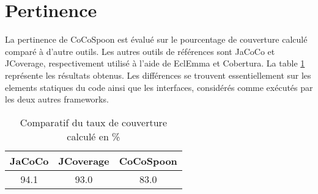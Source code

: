 \section{Pertinence}

La pertinence de CoCoSpoon est évalué sur le pourcentage de couverture calculé comparé à d'autre outils. Les autres outils de références sont JaCoCo et JCoverage, respectivement utilisé à l'aide de EclEmma et Cobertura. La table \ref{evaluation_pertinence} représente les résultats obtenus. Les différences se trouvent essentiellement sur les elements statiques du code ainsi que les interfaces, considérés comme exécutés par les deux autres frameworks. 

\begin{table}[H]
\centering
\begin{tabular}{|c|c|c|}
  \hline
  JaCoCo & JCoverage & CoCoSpoon \\
  \hline
  94.1 & 93.0 & 83.0 \\
  \hline
\end{tabular}

\label{evaluation_pertinence}
\caption{Comparatif du taux de couverture calculé en \%}
\end{table}